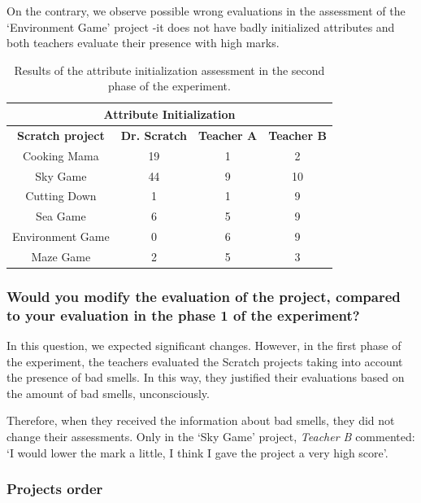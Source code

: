 On the contrary, we observe possible wrong evaluations in the assessment of the `Environment Game' project -it does not have badly initialized attributes and both teachers evaluate their presence with high marks. 

\begin{table}
    \centering
    \begin{tabular}{|c|c|c|c|}
        \hline
        \multicolumn{4}{|c|}{\textbf{Attribute Initialization}} \\ \hline
        \textbf{Scratch project} & \textbf{Dr. Scratch} & \textbf{Teacher A} & \textbf{Teacher B} \\ \hline
        Cooking Mama  & 19 & 1 & 2  \\ \hline
        Sky Game & 44 & 9 & 10 \\ \hline
        Cutting Down  & 1 & 1 & 9  \\ \hline
        Sea Game  & 6 & 5 & 9  \\ \hline
        Environment Game  & 0 & 6 & 9  \\ \hline
        Maze Game  & 2 & 5 & 3  \\ \hline
    \end{tabular}
    \caption{Results of the attribute initialization assessment in the second phase of the experiment.}
    \label{table:assessment_experiment_attribute_initialization}
\end{table}


\subsubsection{Would you modify the evaluation of the project, compared to your evaluation in the phase 1 of the experiment?}
\label{subsubsec:modification_experiment}

In this question, we expected significant changes. However, in the first phase of the experiment, the teachers evaluated the Scratch projects taking into account the presence of bad smells. In this way, they justified their evaluations based on the amount of bad smells, unconsciously.

Therefore, when they received the information about bad smells, they did not change their assessments. Only in the `Sky Game' project, \textit{Teacher B} commented: `I would lower the mark a little, I think I gave the project a very high score'. 


\subsubsection{Projects order}
\label{subsubsec:projects_order_2}

